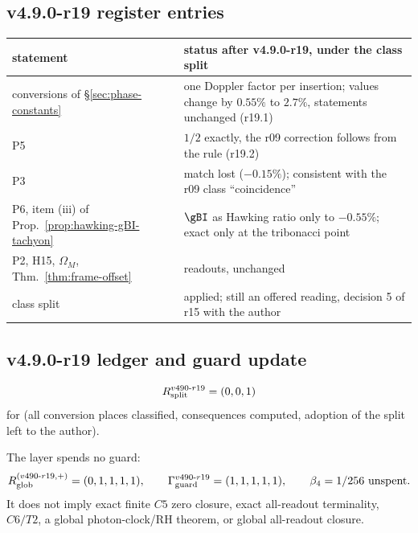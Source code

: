 \subsection*{v4.9.0-r19 register entries}
\label{subsec:v490-r19-register}

\begin{center}
\small
\begin{tabular}{@{}>{\raggedright\arraybackslash}p{}>{\raggedright\arraybackslash}p{}@{}}
\toprule
statement & status after v4.9.0-r19, under the class split\\
\midrule
conversions of \S\ref{sec:phase-constants} & one Doppler factor per insertion; values change by \(0.55\%\) to \(2.7\%\), statements unchanged (r19.1)\\
P5 & \(1/2\) exactly, the r09 correction follows from the rule (r19.2)\\
P3 & match lost (\(-0.15\%\)); consistent with the r09 class ``coincidence''\\
P6, item (iii) of Prop.~\ref{prop:hawking-gBI-tachyon} & \(\gBI\) as Hawking ratio only to \(-0.55\%\); exact only at the tribonacci point\\
P2, H15, \(\Omega_M\), Thm.~\ref{thm:frame-offset} & readouts, unchanged\\
class split & applied; still an offered reading, decision 5 of r15 with the author\\
\bottomrule
\end{tabular}
\end{center}

\subsection*{v4.9.0-r19 ledger and guard update}
\label{subsec:v490-r19-ledger-guard}

\[
R_{\rm split}^{v490\text{-}r19}=(0,0,1)
\]
for (all conversion places classified, consequences computed, adoption of the split left to the author).

The layer spends no guard:
\[
R_{\rm glob}^{(v490\text{-}r19,+)}=(0,1,1,1,1),
\qquad
\Gamma_{\rm guard}^{v490\text{-}r19}=(1,1,1,1,1),
\qquad
\beta_4=1/256\ \text{unspent}.
\]
It does not imply exact finite \(C5\) zero closure, exact all-readout terminality,
\(C6/T2\), a global photon-clock/RH theorem, or global all-readout closure.


